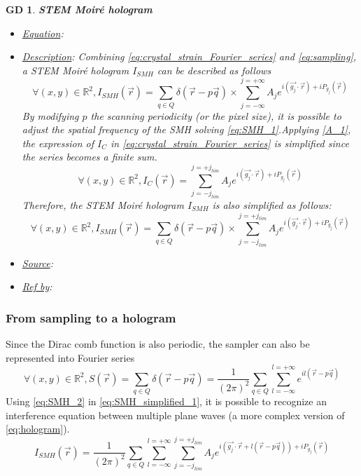 \documentclass[12pt]{article}
\newtheorem{GD}{GD}
\begin{document}
\begin{GD}
\normalfont \textbf{STEM Moir{\'e} hologram}
\begin{itemize}
\item \underline{Equation}: 
\item \underline{Description}: Combining \cref{eq:crystal_strain_Fourier_series} and \cref{eq:sampling}, a STEM Moir{\'e} hologram $I_{SMH}$ can be described as follows
\begin{equation}
\forall (x,y) \in \mathbb{R}^{2}, I_{SMH}(\vec{r})=\sum_{q\in Q}\delta(\vec{r}-p\vec{q})\times\sum_{j=-\infty}^{j=+\infty}A_je^{i(\vec{g_j}\cdot\vec{r})+iP_{g_{j}}(\vec{r})}
\label{eq:SMH_1}
\end{equation}
By modifying $p$ the scanning periodicity (or the pixel size), it is possible to adjust the spatial frequency of the SMH solving \cref{eq:SMH_1}.Applying \cref{A_1}, the expression of $I_C$ in \cref{eq:crystal_strain_Fourier_series} is simplified since the series becomes a finite sum.
\begin{equation}
\forall (x,y) \in \mathbb{R}^{2},I_C(\vec{r})=\sum_{j=-j_{lim}}^{j=+j_{lim}}A_je^{i(\vec{g_j}\cdot\vec{r})+iP_{g_{j}}(\vec{r})}
\label{eq:crystal_lattice_simplified}
\end{equation}
Therefore, the STEM Moir{\'e} hologram $I_{SMH}$ is also simplified as follows:
\begin{equation}
\forall (x,y) \in \mathbb{R}^{2}, I_{SMH}(\vec{r})=\sum_{q\in Q}\delta(\vec{r}-p\vec{q})\times\sum_{j=-j_{lim}}^{j=+j_{lim}}A_je^{i(\vec{g_j}\cdot\vec{r})+iP_{g_{j}}(\vec{r})}
\label{eq:SMH_simplified_1}
\end{equation}
\item \underline{Source}:\cite{Pofelski2017}
\item \underline{Ref by}:
\end{itemize}
\label{GD_2}
\end{GD}

\subsubsection*{From sampling to a hologram}

Since the Dirac comb function is also periodic, the sampler can also be represented into Fourier series
\begin{equation}
\forall (x,y) \in \mathbb{R}^{2}, S(\vec{r})=\sum_{q\in Q}\delta(\vec{r}-p\vec{q}) = \frac{1}{(2\pi)^2}\sum_{q\in Q}\sum_{l=-\infty}^{l=+\infty}e^{il(\vec{r}-p\vec{q})}
\label{eq:SMH_2}
\end{equation}
Using \cref{eq:SMH_2} in \cref{eq:SMH_simplified_1}, it is possible to recognize an interference equation between multiple plane waves (a more complex version of \cref{eq:hologram}).
\begin{equation}
I_{SMH}(\vec{r})=\frac{1}{(2\pi)^2}\sum_{q\in Q}\sum_{l=-\infty}^{l=+\infty}\sum_{j=-j_{lim}}^{j=+j_{lim}}A_je^{i(\vec{g_j}\cdot\vec{r}+l(\vec{r}-p\vec{q}))+iP_{g_{j}}(\vec{r})}
\label{eq:SMH_3}
\end{equation}
\end{document}
